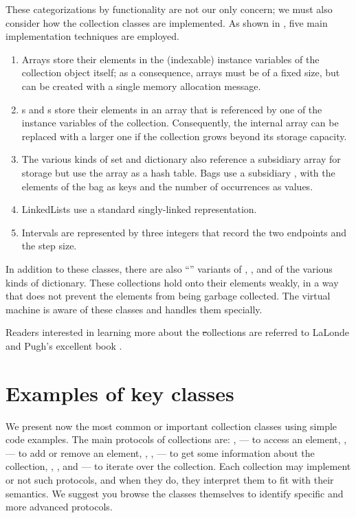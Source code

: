 \documentclass[a4paper,10pt,twoside]{book}
\begin{document}
These categorizations by functionality are not our only concern; we must also consider how the collection classes are implemented.
As shown in , five main implementation techniques are employed.

\begin{enumerate}
  \item Arrays store their elements in the (indexable) instance variables of the collection object itself; as a consequence, arrays must be of a fixed size, but can be created with a single memory allocation message.
  \item {}s and s store their elements in an array that is referenced by one of the instance variables of the collection.
  Consequently, the internal array can be replaced with a larger one if the collection grows beyond its storage capacity.
  \item The various kinds of set and dictionary also reference a subsidiary array for storage but use the array as a hash table.
  Bags use a subsidiary , with the elements of the bag as keys and the number of occurrences as values.
  \item LinkedLists use a standard singly-linked representation.
  \item Intervals are represented by three integers that record the two endpoints and the step size.
\end{enumerate}
In addition to these classes, there are also ``'' variants of , , and of the various kinds of dictionary.
These collections hold onto their elements weakly, \ie in a way that does not prevent the elements from being garbage collected.
The \sq virtual machine is aware of these classes and handles them specially.

Readers interested in learning more about the \st collections are referred to LaLonde and Pugh's excellent book \cite{LaLo90a}.

\section{Examples of key classes}
We present now the most common or important collection classes using simple code examples.
The main protocols of collections are: ,  --- to access an element, ,  --- to add or remove an element, , ,  --- to get some information about the collection, , , and  --- to iterate over the collection.
Each collection may implement or not such protocols, and when they do, they interpret them to fit with their semantics.
We suggest you browse the classes themselves to identify specific and more advanced protocols.
\end{document}
